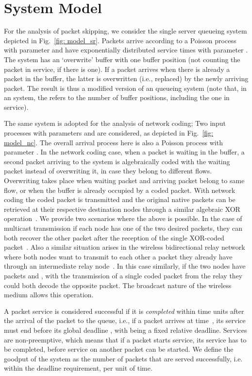 \documentclass[preprint,12pt]{elsarticle}
\theoremstyle{definition}
\theoremstyle{plain}
\theoremstyle{remark}
\begin{document}
\section{System Model} \label{section:system-model}
For the analysis of packet skipping, we consider the single server queueing system depicted in Fig.~\ref{fig: model_sr}.
Packets arrive according to a Poisson process with parameter  and have exponentially distributed service times with parameter .
The system has an `overwrite' buffer with one buffer position (not counting the packet in service, if there is one). If a packet arrives when there is already a packet in the buffer, the latter is overwritten (i.e., replaced) by the newly arriving packet. The result is thus a modified version of an  queueing system (note that, in an  system, the  refers to the number of buffer positions, including the one in service).

The same  system is adopted for the analysis of network coding; Two input processes with parameters  and  are considered, as depicted in Fig.~\ref{fig: model_nc}. The overall arrival process here is also a Poisson process with parameter .
In the network coding case, when a packet is waiting in the buffer, a second packet arriving to the system is algebraically coded with the waiting packet instead of overwriting it, in case they belong to different flows. Overwriting takes place when waiting packet and arriving packet belong to same flow, or when the buffer is already occupied by a coded packet. With network coding the coded packet is transmitted and the original native packets can be retrieved at their respective destination nodes through a similar algebraic XOR operation~\cite{ahlswede:network-coding}. We provide two scenarios where the above is possible. In the case of multicast transmission if each node has one of the two desired packets, they can both recover the other packet after the reception of the single XOR-coded packet~\cite{ahlswede:network-coding}. Also a similar situation arises in the wireless bidirectional relay network where both nodes want to transmit to each other a packet they already have through an intermediate relay node~\cite{aoun-ewsn2011}. In this case similarly, if the two nodes have packets  and , with the transmission of a single coded packet  from the relay they could both decode the opposite packet. The broadcast nature of the wireless medium allows this operation.

A packet service is considered successful if it is \emph{completed} within  time units after the arrival of the packet to the queue, i.e., if a packet arrives at time~, its service must end before its global deadline , with  being a fixed relative deadline. Services are non-preemptive, which means that if a packet starts service, its service has to be completed, before service on another packet can be started. We define the goodput of the system as the number of packets that are served successfully, i.e. within the deadline requirement, per unit of time.
\end{document}
